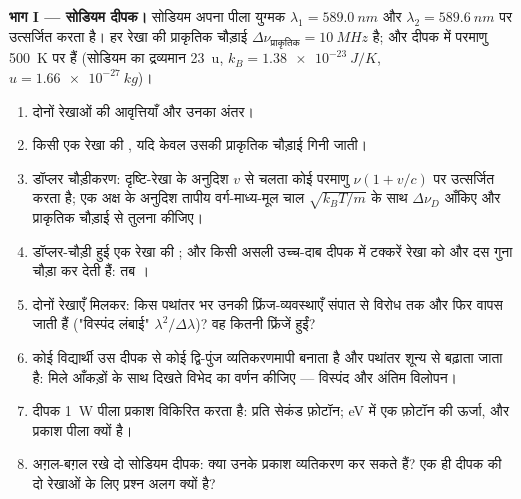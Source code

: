 \begin{problem}
\label{pb:b2:scalar-light-model:1}

\medskip
\noindent\textbf{भाग I --- सोडियम दीपक।}
सोडियम अपना पीला युग्मक $\lambda_1 = \qty{589.0}{nm}$ और $\lambda_2 =
\qty{589.6}{nm}$ पर उत्सर्जित करता है। हर रेखा की प्राकृतिक चौड़ाई $\Delta\nu_{\text{प्राकृतिक}} =
\qty{10}{MHz}$ है; और दीपक में परमाणु \qty{500}{K} पर हैं (सोडियम का द्रव्यमान
\qty{23}{u}, $k_B = \qty{1.38e-23}{J/K}$, $u = \qty{1.66e-27}{kg}$)।
\begin{enumerate}
  \item दोनों रेखाओं की आवृत्तियाँ और उनका अंतर।
  \item किसी एक रेखा की , यदि केवल उसकी प्राकृतिक चौड़ाई
        गिनी जाती।
  \item डॉप्लर चौड़ीकरण: दृष्टि-रेखा के अनुदिश $v$ से चलता कोई परमाणु
        $\nu(1 + v/c)$ पर उत्सर्जित करता है; एक अक्ष के अनुदिश तापीय वर्ग-माध्य-मूल
        चाल $\sqrt{k_BT
        /m}$ के साथ $\Delta\nu_D$ आँकिए और प्राकृतिक चौड़ाई से तुलना
        कीजिए।
  \item डॉप्लर-चौड़ी हुई एक रेखा की ; और किसी असली
        उच्च-दाब दीपक में टक्करें रेखा को और दस गुना चौड़ा कर देती
        हैं: तब ।
  \item दोनों रेखाएँ मिलकर: किस पथांतर भर उनकी फ्रिंज-व्यवस्थाएँ
        संपात से विरोध तक और फिर वापस जाती हैं
        ("विस्पंद लंबाई" $\lambda^2/\Delta\lambda$)? वह कितनी फ्रिंजें हुईं?
  \item कोई विद्यार्थी उस दीपक से कोई द्वि-पुंज व्यतिकरणमापी बनाता है और
        पथांतर शून्य से बढ़ाता जाता है: मिले आँकड़ों के साथ
        दिखते विभेद का वर्णन कीजिए --- विस्पंद और अंतिम
        विलोपन।
  \item दीपक \qty{1}{W} पीला प्रकाश विकिरित करता है: प्रति सेकंड फ़ोटॉन;
        eV में एक फ़ोटॉन की ऊर्जा, और प्रकाश पीला क्यों है।
  \item अग़ल-बग़ल रखे दो सोडियम दीपक: क्या उनके प्रकाश व्यतिकरण कर सकते हैं?
        एक ही दीपक की दो रेखाओं के लिए प्रश्न अलग क्यों है?
\end{enumerate}


\end{problem}
